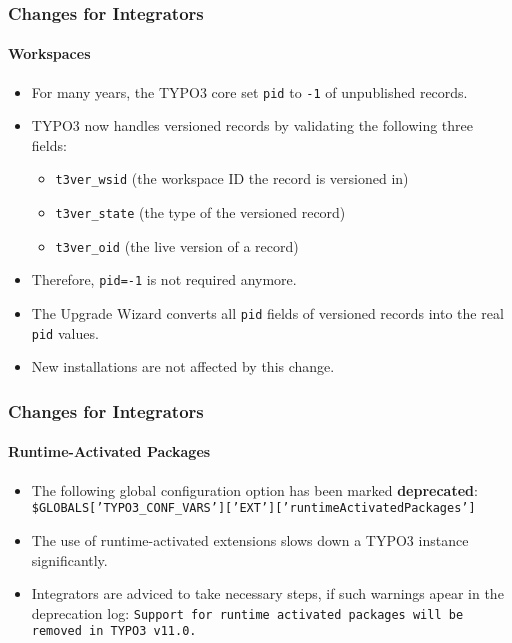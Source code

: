 \begin{frame}[fragile]
	\frametitle{Changes for Integrators}
	\framesubtitle{Workspaces}

	\begin{itemize}
		\item For many years, the TYPO3 core set \texttt{pid} to \texttt{-1} of unpublished records.
		\item TYPO3 now handles versioned records by validating the following three fields:

			\begin{itemize}
				\item \texttt{t3ver\_wsid} (the workspace ID the record is versioned in)
				\item \texttt{t3ver\_state} (the type of the versioned record)
				\item \texttt{t3ver\_oid} (the live version of a record)
			\end{itemize}

		\item Therefore, \texttt{pid=-1} is not required anymore.
		\item The Upgrade Wizard converts all \texttt{pid} fields of versioned records
			into the real \texttt{pid} values.
		\item New installations are not affected by this change.

	\end{itemize}

\end{frame}


\begin{frame}[fragile]
	\frametitle{Changes for Integrators}
	\framesubtitle{Runtime-Activated Packages}

	\begin{itemize}
		\item The following global configuration option has been marked \textbf{deprecated}:\newline
			\smaller
				\texttt{\$GLOBALS['TYPO3\_CONF\_VARS']['EXT']['runtimeActivatedPackages']}
			\normalsize
		\item The use of runtime-activated extensions slows down a TYPO3 instance significantly.
		\item Integrators are adviced to take necessary steps, if such warnings apear
			in the deprecation log:\newline
			\begingroup
				\fontsize{8}{10}
				\texttt{Support for runtime activated packages will be removed in TYPO3 v11.0.}
			\endgroup

	\end{itemize}

\end{frame}

